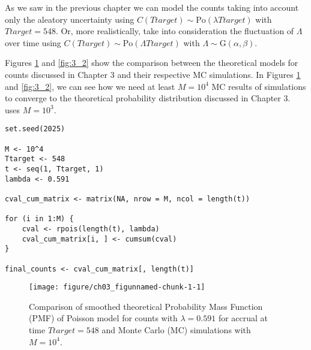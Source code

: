 As we saw in the previous chapter we can model the counts taking into account only the aleatory uncertainty using $C(Ttarget)\sim \textrm{Po}(\lambda Ttarget)$ with $Ttarget=548$. Or, more realistically, take into consideration the fluctuation of $\Lambda$ over time using $C(Ttarget)\sim \textrm{Po}(\Lambda Ttarget)$ with $\Lambda\sim \textrm{G}(\alpha, \beta)$.

Figures \ref{fig:3_1} and \ref{fig:3_2} show the comparison between the theoretical models for counts discussed in Chapter 3 and their respective MC simulations. In Figures \ref{fig:3_1} and \ref{fig:3_2}, we can see how we need at least $M=10^4$ MC results of simulations to converge to the theoretical probability distribution discussed in Chapter 3. \cite{carter2004application} uses $M = 10^3$.


\begin{knitrout}
\color{fgcolor}\begin{kframe}
\begin{verbatim}
set.seed(2025)

M <- 10^4
Ttarget <- 548
t <- seq(1, Ttarget, 1)
lambda <- 0.591

cval_cum_matrix <- matrix(NA, nrow = M, ncol = length(t))

for (i in 1:M) {
	cval <- rpois(length(t), lambda)
	cval_cum_matrix[i, ] <- cumsum(cval)
}

final_counts <- cval_cum_matrix[, length(t)]
\end{verbatim}
\end{kframe}
\end{knitrout}


\begin{figure}[h]
\begin{knitrout}
\color{fgcolor}
\texttt{[image: figure/ch03\_figunnamed-chunk-1-1]} 
\end{knitrout}
  \caption{Comparison of smoothed theoretical Probability Mass Function (PMF) of Poisson model for counts with $\lambda = 0.591$ for accrual at time $Ttarget=548$ and Monte Carlo (MC) simulations with $M=10^4$.}
  \label{fig:3_1}
\end{figure}


